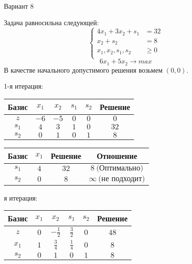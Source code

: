 \documentclass{article}%
\begin{document}
\newpage%
\begin{center}%
\begin{Huge}%
Вариант 8%
\end{Huge}%
\end{center}%
Задача равносильна следующей: %
\[%
\left\{\begin{aligned}4x_{1}+3x_{2}+s_{1} & =32 \\x_{2}+s_{2} & =8 \\x_{1},x_{2},s_{1},s_{2} & \ge 0 \\ \end{aligned}\right.%
\]%
\[%
6x_{1}+5x_{2}  \to max%
\]%
В качестве начального допустимого решения возьмем %
$(0, 0).$%
\begin{flushleft}%
1{-}я итерация: %
\newline%
\newline%
\renewcommand{\arraystretch}{1.3}%
\begin{tabular}{|c|cccc|c|}%
\hline%
Базис&$x_{1}$&$x_{2}$&$s_{1}$&$s_{2}$&Решение\\%
\hline%
$z$&$-6$&$-5$&$0$&$0$&$0$\\%
\hline%
$s_{1}$&$4$&$3$&$1$&$0$&$32$\\%
$s_{2}$&$0$&$1$&$0$&$1$&$8$\\%
\hline%
\end{tabular}%
\newline%
\newline%
\newline%
\begin{tabular}{|cccc|}%
\hline%
Базис&$x_{1}$&Решение&Отношение\\%
\hline%
$s_{1}$&$4$&$32$&$8\: \text{(Оптимально)}$\\%
$s_{2}$&$0$&$8$&$\infty \: \text{(не подходит)}$\\%
\hline%
\end{tabular}%
\newline%
\newline%
я итерация: %
\newline%
\newline%
\renewcommand{\arraystretch}{1.3}%
\begin{tabular}{|c|cccc|c|}%
\hline%
Базис&$x_{1}$&$x_{2}$&$s_{1}$&$s_{2}$&Решение\\%
\hline%
$z$&$0$&$-\frac{1}{2}$&$\frac{3}{2}$&$0$&$48$\\%
\hline%
$x_{1}$&$1$&$\frac{3}{4}$&$\frac{1}{4}$&$0$&$8$\\%
$s_{2}$&$0$&$1$&$0$&$1$&$8$\\%

\end{tabular}
\end{flushleft}
\end{document}

